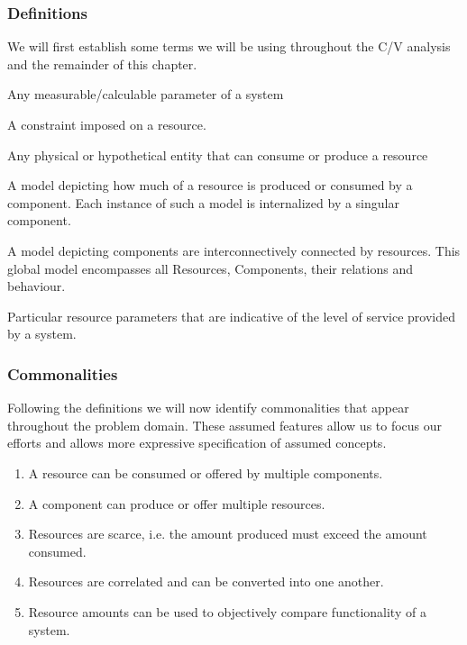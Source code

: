 \subsubsection{Definitions}
We will first establish some terms we will be using throughout the C/V analysis and the remainder of this chapter. 
\begin{description}[style=nextline]
\nospace
\item[Resource] Any measurable/calculable parameter of a system
\item[Resource constraint] A constraint imposed on a resource.
\item[Component] Any physical or hypothetical entity that can consume or produce a resource
\item[Resource Utilization Model (RUM)] A model depicting how much of a resource is produced or consumed by a component. Each instance of such a model is internalized by a singular component.
\item[Resource Distribution Model (RDM)] A model depicting components are interconnectively connected by resources. This global model encompasses all Resources, Components, their relations and behaviour. 
\item[Quality of Service (QoS)] Particular resource parameters that are indicative of the level of service provided by a system.
\end{description}
\subsubsection{Commonalities}
Following the definitions we will now identify commonalities that appear throughout the problem domain. These assumed features allow us to focus our efforts and allows more expressive specification of assumed concepts.
\begin{enumerate}[label=C\rdmid .\arabic*]
\nospace
\item \label{c:1resource_multiplex} A resource can be consumed or offered by multiple components.
\item \label{c:2component_multiplex} A component can produce or offer multiple resources.
\item \label{c:3scarce} Resources are scarce, i.e. the amount produced must exceed the amount consumed.
\item \label{c:4res_transf} Resources are correlated and can be converted into one another.
\item \label{c:5optimize} Resource amounts can be used to objectively compare functionality of a system.
\end{enumerate}


